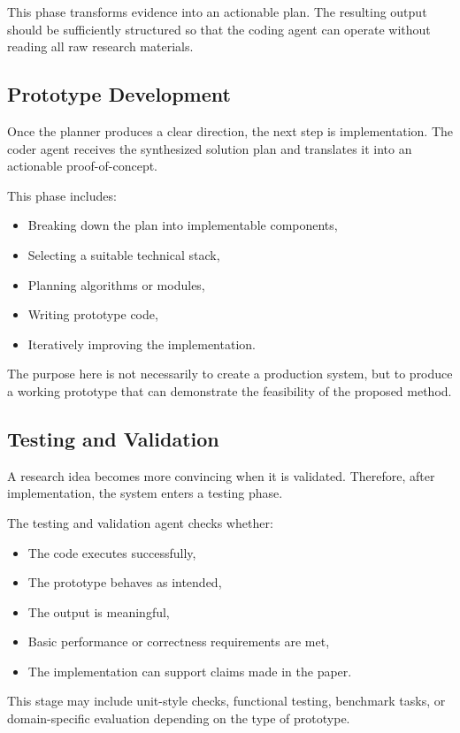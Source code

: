 \documentclass[11pt,a4paper]{article}
\begin{document}
This phase transforms evidence into an actionable plan. The resulting output should be sufficiently structured so that the coding agent can operate without reading all raw research materials.

\subsection{Prototype Development}

Once the planner produces a clear direction, the next step is implementation. The coder agent receives the synthesized solution plan and translates it into an actionable proof-of-concept.

This phase includes:
\begin{itemize}
    \item Breaking down the plan into implementable components,
    \item Selecting a suitable technical stack,
    \item Planning algorithms or modules,
    \item Writing prototype code,
    \item Iteratively improving the implementation.
\end{itemize}

The purpose here is not necessarily to create a production system, but to produce a working prototype that can demonstrate the feasibility of the proposed method.

\subsection{Testing and Validation}

A research idea becomes more convincing when it is validated. Therefore, after implementation, the system enters a testing phase.

The testing and validation agent checks whether:
\begin{itemize}
    \item The code executes successfully,
    \item The prototype behaves as intended,
    \item The output is meaningful,
    \item Basic performance or correctness requirements are met,
    \item The implementation can support claims made in the paper.
\end{itemize}

This stage may include unit-style checks, functional testing, benchmark tasks, or domain-specific evaluation depending on the type of prototype.
\end{document}
